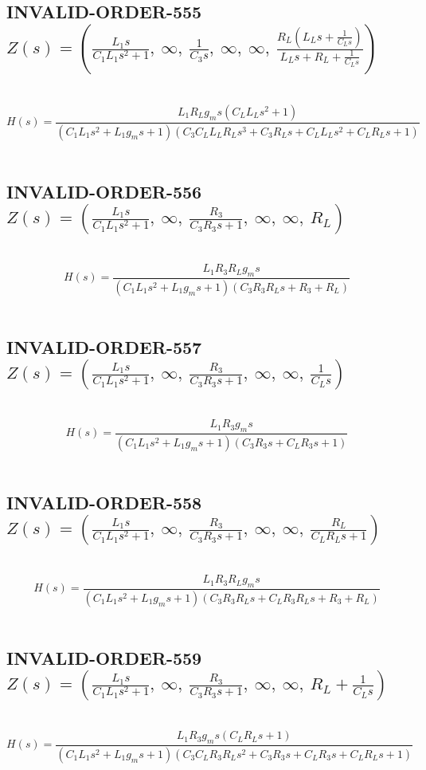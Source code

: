 \documentclass{article}
\begin{document}
\subsection{INVALID-ORDER-555 $Z(s) = \left( \frac{L_{1} s}{C_{1} L_{1} s^{2} + 1}, \  \infty, \  \frac{1}{C_{3} s}, \  \infty, \  \infty, \  \frac{R_{L} \left(L_{L} s + \frac{1}{C_{L} s}\right)}{L_{L} s + R_{L} + \frac{1}{C_{L} s}}\right)$ } \ 
\textbf{\[H(s) = \frac{L_{1} R_{L} g_{m} s \left(C_{L} L_{L} s^{2} + 1\right)}{\left(C_{1} L_{1} s^{2} + L_{1} g_{m} s + 1\right) \left(C_{3} C_{L} L_{L} R_{L} s^{3} + C_{3} R_{L} s + C_{L} L_{L} s^{2} + C_{L} R_{L} s + 1\right)}\] } \ 
\subsection{INVALID-ORDER-556 $Z(s) = \left( \frac{L_{1} s}{C_{1} L_{1} s^{2} + 1}, \  \infty, \  \frac{R_{3}}{C_{3} R_{3} s + 1}, \  \infty, \  \infty, \  R_{L}\right)$ } \ 
\textbf{\[H(s) = \frac{L_{1} R_{3} R_{L} g_{m} s}{\left(C_{1} L_{1} s^{2} + L_{1} g_{m} s + 1\right) \left(C_{3} R_{3} R_{L} s + R_{3} + R_{L}\right)}\] } \ 
\subsection{INVALID-ORDER-557 $Z(s) = \left( \frac{L_{1} s}{C_{1} L_{1} s^{2} + 1}, \  \infty, \  \frac{R_{3}}{C_{3} R_{3} s + 1}, \  \infty, \  \infty, \  \frac{1}{C_{L} s}\right)$ } \ 
\textbf{\[H(s) = \frac{L_{1} R_{3} g_{m} s}{\left(C_{1} L_{1} s^{2} + L_{1} g_{m} s + 1\right) \left(C_{3} R_{3} s + C_{L} R_{3} s + 1\right)}\] } \ 
\subsection{INVALID-ORDER-558 $Z(s) = \left( \frac{L_{1} s}{C_{1} L_{1} s^{2} + 1}, \  \infty, \  \frac{R_{3}}{C_{3} R_{3} s + 1}, \  \infty, \  \infty, \  \frac{R_{L}}{C_{L} R_{L} s + 1}\right)$ } \ 
\textbf{\[H(s) = \frac{L_{1} R_{3} R_{L} g_{m} s}{\left(C_{1} L_{1} s^{2} + L_{1} g_{m} s + 1\right) \left(C_{3} R_{3} R_{L} s + C_{L} R_{3} R_{L} s + R_{3} + R_{L}\right)}\] } \ 
\subsection{INVALID-ORDER-559 $Z(s) = \left( \frac{L_{1} s}{C_{1} L_{1} s^{2} + 1}, \  \infty, \  \frac{R_{3}}{C_{3} R_{3} s + 1}, \  \infty, \  \infty, \  R_{L} + \frac{1}{C_{L} s}\right)$ } \ 
\textbf{\[H(s) = \frac{L_{1} R_{3} g_{m} s \left(C_{L} R_{L} s + 1\right)}{\left(C_{1} L_{1} s^{2} + L_{1} g_{m} s + 1\right) \left(C_{3} C_{L} R_{3} R_{L} s^{2} + C_{3} R_{3} s + C_{L} R_{3} s + C_{L} R_{L} s + 1\right)}\] } \ 
\end{document}
